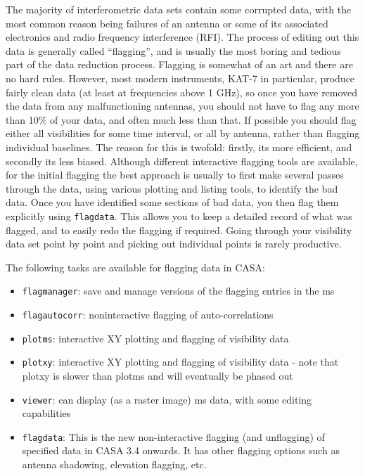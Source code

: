 \documentclass[force,almostfull,justified]{tufte-book}
\begin{document}
The majority of interferometric data sets contain some corrupted data, with the most common reason
being failures of an antenna or some of its associated electronics and radio frequency interference
(RFI).  The process of editing out this data is generally called ``flagging'', and is usually the most
boring and tedious part of the data reduction process.  Flagging is somewhat of an art and there are
no hard rules.  However, most modern instruments, KAT-7 in particular, produce fairly clean data (at
least at frequencies above 1 GHz), so once you have removed the data from any malfunctioning antennas,
you should not have to flag any more than 10\% of your data, and often much less than that.  If
possible you should flag either all visibilities for some time interval, or all by antenna, rather
than flagging individual baselines.  The reason for this is twofold: firstly, its more efficient, and
secondly its less biased.  Although different interactive flagging tools are available, for the
initial flagging the best approach is usually to first make several passes through the data, using
various plotting and listing tools, to identify the bad data.  Once you have identified some sections
of bad data, you then flag them explicitly using {\tt flagdata}.  This allows you to keep a detailed
record of what was flagged, and to easily redo the flagging if required.  Going through your
visibility data set point by point and picking out individual points is rarely productive.


The following tasks are available for flagging data in CASA:

\begin{itemize}
\item {\tt flagmanager}: save and manage versions of the flagging entries in the ms
\item {\tt flagautocorr}: noninteractive flagging of auto-correlations
\item {\tt plotms}: interactive XY plotting and flagging of visibility data
\item {\tt plotxy}: interactive XY plotting and flagging of visibility data -
note that plotxy is slower than plotms and will eventually be phased out
\item {\tt viewer}: can display (as a raster image) ms data, with some editing capabilities
\item {\tt flagdata}: This is the new non-interactive flagging (and
  unflagging) of specified data in CASA 3.4 onwards. It has other
  flagging options such as antenna shadowing, elevation flagging, etc.
\end{itemize}
\end{document}
